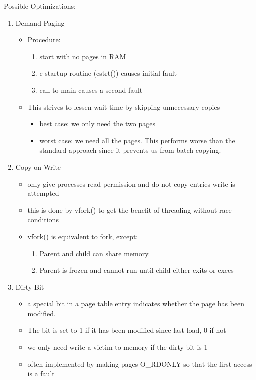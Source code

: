 \documentclass[../../lecture_notes.tex]{subfiles}
\begin{document}
Possible Optimizations:
\begin{enumerate}
\item Demand Paging
	\begin{itemize}
		\item Procedure:
			\begin{enumerate}[label=\arabic*.]
				\item start with no pages in RAM
				\item c startup routine (cstrt()) causes initial fault
				\item call to main causes a second fault
			\end{enumerate}
		\item This strives to lessen wait time by skipping unnecessary copies
			\begin{itemize}
				\item best case: we only need the two pages
				\item worst case: we need all the pages. This performs worse than the standard approach since it prevents us from batch copying.
			\end{itemize}
	\end{itemize}
\item Copy on Write
	\begin{itemize}
		\item only give processes read permission and do not copy entries write is attempted
		\item this is done by vfork() to get the benefit of threading without race conditions
		\item vfork() is equivalent to fork, except:
		\begin{enumerate}[label=(\roman*), nosep]
			\item Parent and child can share memory.
			\item Parent is frozen and cannot run until child either exits or execs
		\end{enumerate}
	\end{itemize}
\item Dirty Bit
	\begin{itemize}
		\item a special bit in a page table entry indicates whether the page has been modified.
		\item The bit is set to 1 if it has been modified since last load, 0 if not
		\item we only need write a victim to memory if the dirty bit is 1
		\item often implemented by making pages O\_RDONLY so that the first access is a fault

\end{itemize}
\end{enumerate}
\end{document}

